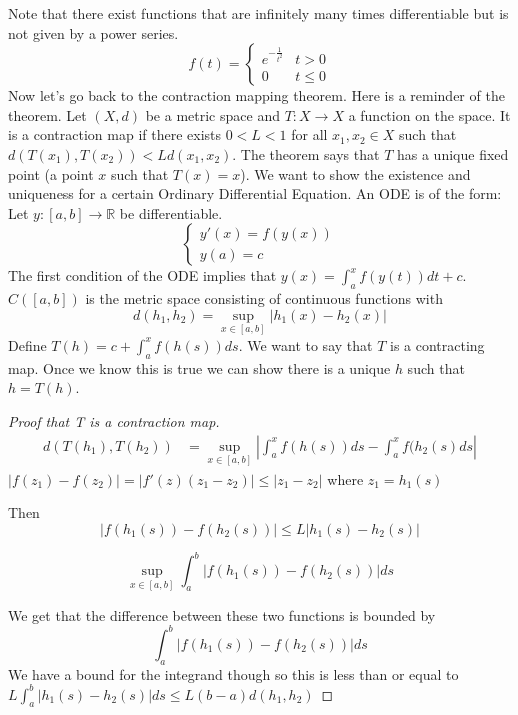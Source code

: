\documentclass{article}
\newcommand{\R}{\mathbb{R}}
\newcommand{\ra}[1][]{\xrightarrow{#1}}
\begin{document}
Note that there exist functions that are infinitely many times differentiable but is not given by a power series.
$$f(t) =
\begin{cases}
e^{-\frac{1}{t^2}} & t>0 \\
0 & t\leq 0
\end{cases}$$
Now let's go back to the contraction mapping theorem. Here is a reminder of the theorem. Let $(X,d)$ be a metric space and $T:X\ra X$ a function on the space. It is a contraction map if there exists $0<L<1$ for all $x_1,x_2\in X$ such that $d(T(x_1),T(x_2))<Ld(x_1,x_2)$. The theorem says that $T$ has a unique fixed point (a point $x$ such that $T(x)=x$).
We want to show the existence and uniqueness for a certain Ordinary Differential Equation.
An ODE is of the form:
Let $y:[a,b]\ra \R$ be differentiable.
$$
\begin{cases}
y'(x)=f(y(x))\\
y(a)=c
\end{cases}
$$
The first condition of the ODE implies that $y(x)=\int_a^x f(y(t)) dt+c$. $C([a,b])$ is the metric space consisting of continuous  functions with $$d(h_1,h_2)=\sup_{x\in[a,b]}{|h_1(x)-h_2(x)|}$$
Define $T(h)=c+\int_a^xf(h(s))ds$.
We want to say that $T$ is a contracting map. Once we know this is true we can show there is a unique $h$ such that $h=T(h)$.
\begin{proof}[Proof that T is a contraction map]
\begin{equation*}
    \begin{split}
        d(T(h_1),T(h_2)) & = \sup_{x\in[a,b]}|\int_a^xf(h(s))ds-\int_a^xf(h_2(s)ds|
    \end{split}
\end{equation*}
$|f(z_1)-f(z_2)|=|f'(z)(z_1-z_2)|\leq|z_1-z_2|$ where $z_1=h_1(s)$

Then $$|f(h_1(s))-f(h_2(s))|\leq L|h_1(s)-h_2(s)|$$

$$\sup_{x\in[a,b]}\int_a^b|f(h_1(s))-f(h_2(s))|ds$$

We get that the difference between these two functions is bounded by
$$\int_a^b|f(h_1(s))-f(h_2(s))|ds$$
We have a bound for the integrand though so this is less than or equal to $L\int_a^b|h_1(s)-h_2(s)|ds\leq L(b-a)d(h_1,h_2)$
\end{proof}
\end{document}
